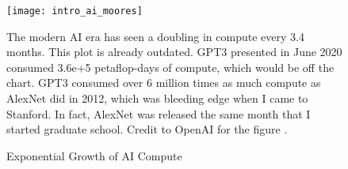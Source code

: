 \begin{figure}[h]
\texttt{[image: intro\_ai\_moores]}
\caption{Exponential Growth of AI Compute}
\vspace{12px}
The modern AI era has seen a doubling in compute every 3.4 months.  This plot is already outdated.  GPT3 presented in June 2020 consumed 3.6e+5 petaflop-days of compute, which would be off the chart.  GPT3 consumed over 6 million times as much compute as AlexNet did in 2012, which was bleeding edge when I came to Stanford.  In fact, AlexNet was released the same month that I started graduate school.  Credit to OpenAI for the figure \cite{openai2018compute}.
\vspace{12px}
\label{fig:intro_ai_moores}
\end{figure}